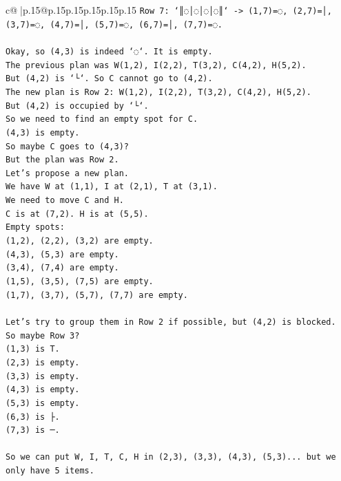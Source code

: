 \documentclass{article}
\begin{document}
{\begin{supertabular}{c@{$\;$}|p{.15\linewidth}@{}p{.15\linewidth}p{.15\linewidth}p{.15\linewidth}p{.15\linewidth}p{.15\linewidth}}
{{{\texttt{Row 7: `║◌│◌│◌│◌║` {-}> (1,7)=◌, (2,7)=│, (3,7)=◌, (4,7)=│, (5,7)=◌, (6,7)=│, (7,7)=◌.} \\
\\ 
\texttt{Okay, so (4,3) is indeed `◌`. It is empty.} \\
\texttt{The previous plan was W(1,2), I(2,2), T(3,2), C(4,2), H(5,2).} \\
\texttt{But (4,2) is `└`. So C cannot go to (4,2).} \\
\texttt{The new plan is Row 2: W(1,2), I(2,2), T(3,2), C(4,2), H(5,2).} \\
\texttt{But (4,2) is occupied by `└`.} \\
\texttt{So we need to find an empty spot for C.} \\
\texttt{(4,3) is empty.} \\
\texttt{So maybe C goes to (4,3)?} \\
\texttt{But the plan was Row 2.} \\
\texttt{Let's propose a new plan.} \\
\texttt{We have W at (1,1), I at (2,1), T at (3,1).} \\
\texttt{We need to move C and H.} \\
\texttt{C is at (7,2). H is at (5,5).} \\
\texttt{Empty spots:} \\
\texttt{(1,2), (2,2), (3,2) are empty.} \\
\texttt{(4,3), (5,3) are empty.} \\
\texttt{(3,4), (7,4) are empty.} \\
\texttt{(1,5), (3,5), (7,5) are empty.} \\
\texttt{(1,7), (3,7), (5,7), (7,7) are empty.} \\
\\ 
\texttt{Let's try to group them in Row 2 if possible, but (4,2) is blocked.} \\
\texttt{So maybe Row 3?} \\
\texttt{(1,3) is T.} \\
\texttt{(2,3) is empty.} \\
\texttt{(3,3) is empty.} \\
\texttt{(4,3) is empty.} \\
\texttt{(5,3) is empty.} \\
\texttt{(6,3) is ├.} \\
\texttt{(7,3) is ─.} \\
\\ 
\texttt{So we can put W, I, T, C, H in (2,3), (3,3), (4,3), (5,3)... but we only have 5 items.} \\
}}}
\end{supertabular}}
\end{document}
